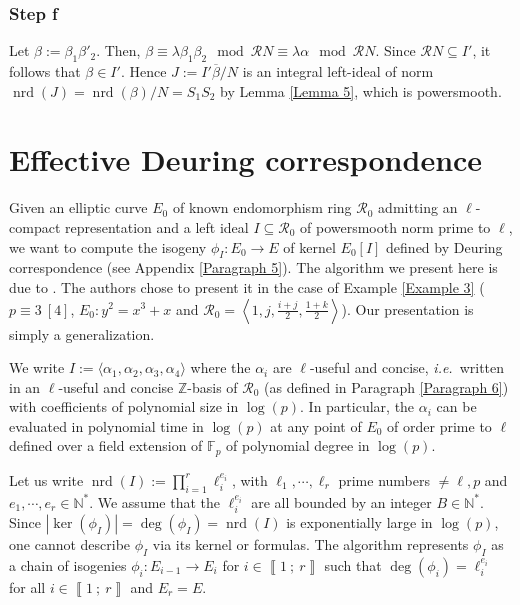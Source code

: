 \documentclass[a4paper,10pt,notitlepage]{report}
\theoremstyle{definition}
\theoremstyle{plain}
\theoremstyle{definition}
\newcommand{\ie}{\emph{i.e.}\ }
\newcommand{\N}{\mathbb{N}}
\newcommand{\Z}{\mathbb{Z}}
\newcommand{\F}{\mathbb{F}}
\newcommand{\m}[1]{\mathcal{#1}}
\renewcommand{\i}[2]{\left\llbracket #1~;~#2\right\rrbracket}
\renewcommand{\(}{\left(}
\renewcommand{\)}{\right)}
\DeclareMathOperator{\nrd}{nrd}
\begin{document}
\subsubsection{Step f}

Let $\beta:=\beta_1\beta'_2$. Then, $\beta\equiv \lambda\beta_1\beta_2 \mod \m{R}N\equiv \lambda\alpha \mod \m{R}N$. Since $\m{R}N\subseteq I'$, it follows that $\beta\in I'$. Hence $J:=I'\overline{\beta}/N$ is an integral left-ideal of norm $\nrd(J)=\nrd(\beta)/N=S_1S_2$ by Lemma \ref{Lemma 5}, which is powersmooth. 

\section{Effective Deuring correspondence}\label{Paragraph 4}

Given an elliptic curve $E_0$ of known endomorphism ring $\m{R}_0$ admitting an $\ell$-compact representation and a left ideal $I\subseteq \m{R}_0$ of powersmooth norm prime to $\ell$, we want to compute the isogeny $\phi_I : E_0\longrightarrow E$ of kernel $E_0[I]$ defined by Deuring correspondence (see Appendix \ref{Paragraph 5}). The algorithm we present here is due to \cite{Galbraith2016}. The authors chose to present it in the case of Example \ref{Example 3} ($p\equiv 3 \ [4]$, $E_0:y^2=x^3+x$ and $\m{R}_0=\left \langle 1, j,\frac{i+j}{2},\frac{1+k}{2}\right\rangle$). Our presentation is simply a generalization.

We write $I:=\langle\alpha_1,\alpha_2,\alpha_3,\alpha_4\rangle$ where the $\alpha_i$ are $\ell$-useful and concise, \ie written in an $\ell$-useful and concise $\Z$-basis of $\m{R}_0$ (as defined in Paragraph \ref{Paragraph 6}) with coefficients of polynomial size in $\log(p)$.  In particular, the $\alpha_i$ can be evaluated in polynomial time in $\log(p)$ at any point of $E_0$ of order prime to $\ell$ defined over a field extension of $\F_p$ of polynomial degree in $\log(p)$.  

Let us write $\nrd(I):=\prod_{i=1}^r \ell_i^{e_i}$, with $\ell_1, \cdots,\ell_r$ prime numbers $\neq \ell, p$ and $e_1,\cdots, e_r\in\N^*$. We assume that the $\ell_i^{e_i}$ are all bounded by an integer $B\in\N^*$.  Since $|\ker(\phi_I)|=\deg(\phi_I)=\nrd(I)$ is exponentially large in $\log(p)$, one cannot describe $\phi_I$ via its kernel or formulas. The algorithm represents $\phi_I$ as a chain of isogenies $\phi_i : E_{i-1}\longrightarrow E_{i}$ for $i\in\i{1}{r}$ such that $\deg(\phi_i)=\ell_i^{e_i}$ for all $i\in\i{1}{r}$ and $E_r=E$. 
\end{document}

